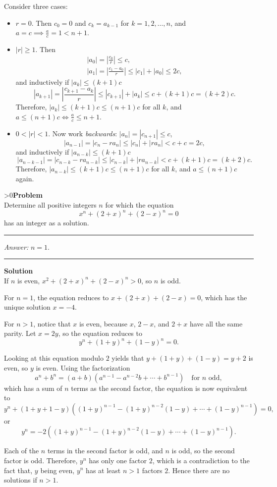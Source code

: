 \documentclass[12pt,oneside,a4paper]{book}
\newcounter{probnum}
\newcounter{solnum}
\newcommand{\prob}{\ifnum\value{probnum}>0\newpage\fi\setcounter{solnum}{0}\stepcounter{probnum}\textbf{Problem \theprobnum}\\}
\newcommand{\ans}{\medskip\hrule\medbreak\emph{Answer: }}
\newcommand{\sol}{\medskip\hrule\medbreak\textbf{Solution}\\}
\begin{document}
Consider three cases:
\begin{itemize}
\item $r=0$. Then $c_0=0$ and $c_k = a_{k-1}$ for $k=1,2,\ldots,n$, and $a=c\implies \frac ac=1<n+1$.
\item $|r|\ge 1$. Then
\begin{gather*}
|a_0| = \left|\frac{c_0}r\right| \le c,\\
|a_1| = \left|\frac{c_1-a_0}r\right| \le |c_1|+|a_0| \le 2c,
\end{gather*}
and inductively if $|a_k| \le (k+1)c$
\[|a_{k+1}| = \left|\frac{c_{k+1}-a_k}r\right| \le |c_{k+1}| + |a_k| \le c+(k+1)c=(k+2)c.\]
Therefore, $|a_k| \le (k+1)c \le (n+1)c$ for all $k$, and $a \le (n+1)c\iff \frac ac\le n+1$.
\item $0 < |r| < 1$. Now work \emph{backwards}: $|a_n| = |c_{n+1}| \le c$,
\[|a_{n-1}| = |c_n - ra_n| \le |c_n| + |ra_n| < c + c = 2c,\]
and inductively if $|a_{n-k}| \le (k+1)c$
\[|a_{n-k-1}| = |c_{n-k} - ra_{n-k}| \le |c_{n-k}| + |ra_{n-k}| < c + (k+1)c = (k+2)c.\]
Therefore, $|a_{n-k}| \le (k+1)c \le (n+1)c$ for all $k$, and $a\le (n+1)c$ again.
\end{itemize}

\prob Determine all positive integers $n$ for which the equation
\[x^n+(2+x)^n+(2-x)^n=0\]
has an integer as a solution.

\ans $n=1$.

\sol
If $n$ is even, $x^2+(2+x)^n+(2-x)^n > 0$, so $n$ is odd.

For $n=1$, the equation reduces to $x+(2+x)+(2-x)=0$, which has the unique solution $x=-4$.

For $n>1$, notice that $x$ is even, because $x$, $2-x$, and $2+x$ have all the same parity. Let $x=2y$, so the equation reduces to
\[y^n + (1+y)^n + (1-y)^n = 0.\]

Looking at this equation modulo $2$ yields that $y+(1+y)+(1-y)=y+2$ is even, so $y$ is even. Using the factorization
\[a^n + b^n = (a+b)(a^{n-1}-a^{n-2}b+\cdots+b^{n-1})\quad\text{for }n\text{ odd},\]
which has a sum of $n$ terms as the second factor, the equation is now equivalent to
\[y^n + (1+y+1-y)((1+y)^{n-1}-(1+y)^{n-2}(1-y) + \cdots +(1-y)^{n-1}) = 0,\]
or
\[y^n = -2((1+y)^{n-1}-(1+y)^{n-2}(1-y) + \cdots +(1-y)^{n-1}).\]

Each of the $n$ terms in the second factor is odd, and $n$ is odd, so the second factor is odd. Therefore, $y^n$ has only one factor $2$, which is a contradiction to the fact that, $y$ being even, $y^n$ has at least $n>1$ factors $2$. Hence there are no solutions if $n>1$.
\end{document}
